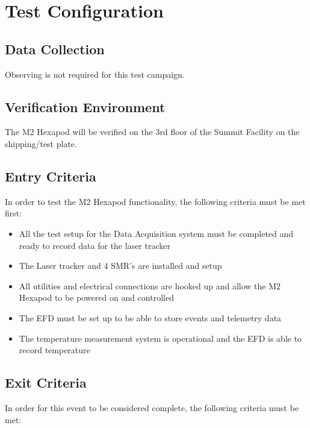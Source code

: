 \documentclass[SE,lsstdraft,STR,toc]{lsstdoc}
\providecommand{\tightlist}{
  \setlength{\itemsep}{0pt}\setlength{\parskip}{0pt}}
\begin{document}
\section{Test Configuration}
\label{sect:configuration}

\subsection{Data Collection}

  Observing is not required for this test campaign.

\subsection{Verification Environment}
\label{sect:hwconf}
  The M2 Hexapod will be verified on the 3rd floor of the Summit Facility
on the shipping/test plate.~

  \subsection{Entry Criteria}
  In order to test the M2 Hexapod functionality, the following criteria
must be met first:

\begin{itemize}
\tightlist
\item
  All the test setup for the Data Acquisition system must be completed
  and ready to record data for the laser tracker
\item
  The Laser tracker and 4 SMR's are installed and setup
\item
  All utilities and electrical connections are hooked up and allow the
  M2 Hexapod to be powered on and controlled
\item
  The EFD must be set up to be able to store events and telemetry data
\item
  The temperature measurement system is operational and the EFD is able
  to record temperature
\end{itemize}

  \subsection{Exit Criteria}
  In order for this event to be considered complete, the following
criteria must be met:
\end{document}
